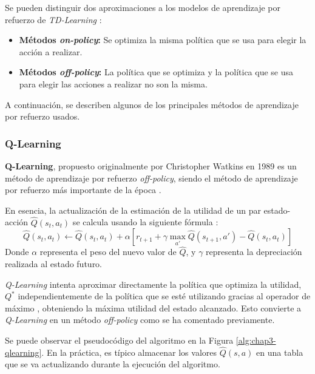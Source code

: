 Se pueden distinguir dos aproximaciones a los modelos de aprendizaje por refuerzo de \textit{TD-Learning} \cite{Sutton1998}:

\begin{itemize}
\item \textbf{Métodos \textit{on-policy}:} Se optimiza la misma política que se usa para elegir la acción a realizar.
\item \textbf{Métodos \textit{off-policy}:} La política que se optimiza y la política que se usa para elegir las acciones a realizar no son la misma.
\end{itemize}

A continuación, se describen algunos de los principales métodos de aprendizaje por refuerzo usados.

\subsubsection{Q-Learning}

\textbf{Q-Learning}, propuesto originalmente por Christopher Watkins en 1989 \cite{qlearning} es un método de aprendizaje por refuerzo \textit{off-policy}, siendo el método de aprendizaje por refuerzo más importante de la época \cite{Sutton1998}.

En esencia, la actualización de la estimación de la utilidad de un par estado-acción $\hat{Q}(s_t,a_t)$ se calcula usando la siguiente fórmula \cite{Sutton1998}:
\[\hat{Q}(s_t,a_t) \leftarrow \hat{Q}(s_t,a_t) + \alpha [r_{t+1} + \gamma \max_{a'} \hat{Q}(s_{t+1},a') - \hat{Q}(s_t,a_t)]\]
Donde $\alpha$ representa el peso del nuevo valor de $\hat{Q}$, y $\gamma$ representa la depreciación realizada al estado futuro.

\textit{Q-Learning} intenta aproximar directamente la política que optimiza la utilidad, $Q^*$ independientemente de la política que se esté utilizando gracias al operador de máximo \cite{Sutton1998}, obteniendo la máxima utilidad del estado alcanzado. Esto convierte a \textit{Q-Learning} en un método \textit{off-policy} como se ha comentado previamente.

Se puede observar el pseudocódigo del algoritmo en la Figura \ref{alg:chap3-qlearning}. En la práctica, es típico almacenar los valores $\hat{Q}(s,a)$ en una tabla que se va actualizando durante la ejecución del algoritmo.

